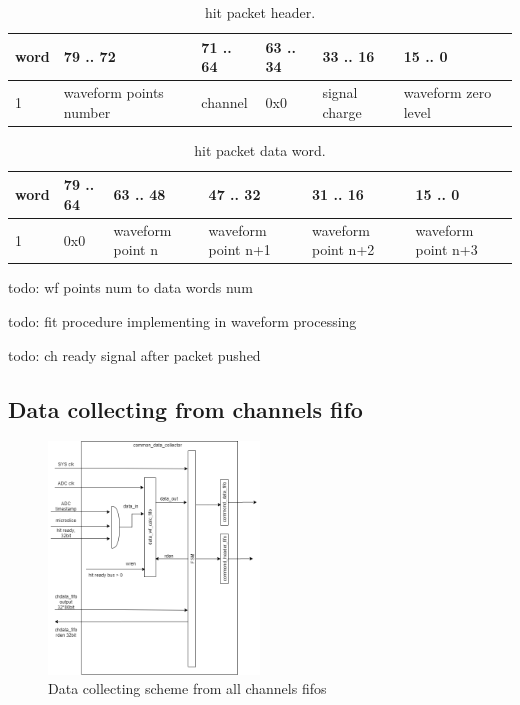 \documentclass{article}
\begin{document}
\begin{table}[H]
\centering
\begin{tabular}{| l | l | l | l | l | l |}
\hline
word & 79 .. 72 & 71 .. 64 & 63 .. 34 & 33 .. 16 & 15 .. 0 \\ \hline
1 & waveform points number & channel & 0x0 & signal charge & waveform zero level \\ \hline
\end{tabular}
\caption{hit packet header.\label{tab2}}
\end{table}

\begin{table}[H]
\centering
\begin{tabular}{| l | l | l | l | l | l |}
\hline
word & 79 .. 64 & 63 .. 48 & 47 .. 32 & 31 .. 16 & 15 .. 0 \\ \hline
1 & 0x0 & waveform point n & waveform point n+1 & waveform point n+2 & waveform point n+3 \\ \hline
\end{tabular}
\caption{hit packet data word.\label{tab2}}
\end{table}


todo: wf points num to data words num

todo: fit procedure implementing in waveform processing

todo: ch ready signal after packet pushed

\subsection{Data collecting from channels fifo}

\begin{figure}[H]
	\centering 
	\includegraphics[width=0.5\textwidth]{ADC_common_event_collection.png}
	\caption{\label{fig:1} Data collecting scheme from all channels fifos}
\end{figure}
\end{document}
